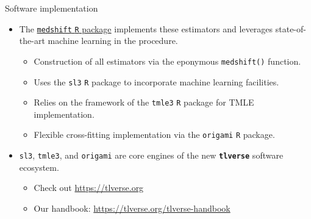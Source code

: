 \documentclass{beamer}
\begin{document}
\begin{frame}[c]{Software implementation}

\begin{center}
\begin{itemize}
  \setlength\itemsep{0.5em}
  \item The \underline{\texttt{medshift} \texttt{R} package}
    \cite{hejazi2019medshift} implements these estimators and leverages
    state-of-the-art machine learning in the procedure.
    \begin{itemize}
      \item Construction of all estimators via the eponymous \texttt{medshift()}
        function.
      \item Uses the \texttt{sl3} \texttt{R} package to incorporate machine
        learning facilities.
      \item Relies on the framework of the \texttt{tmle3} \texttt{R} package for
        TMLE implementation.
      \item Flexible cross-fitting implementation via the \texttt{origami}
        \texttt{R} package.
    \end{itemize}
  \item \texttt{sl3}, \texttt{tmle3}, and \texttt{origami} are core engines of
    the new \textbf{\texttt{tlverse}} software ecosystem.
    \begin{itemize}
      \item Check out \url{https://tlverse.org}
      \item Our handbook: \url{https://tlverse.org/tlverse-handbook}
    \end{itemize}
\end{itemize}
\end{center}

\note{
}

\end{frame}


\setbeamercovered{}
\beamerdefaultoverlayspecification{}

\begin{frame}[c,allowframebreaks]{}

\scriptsize



\end{frame}

\end{document}
